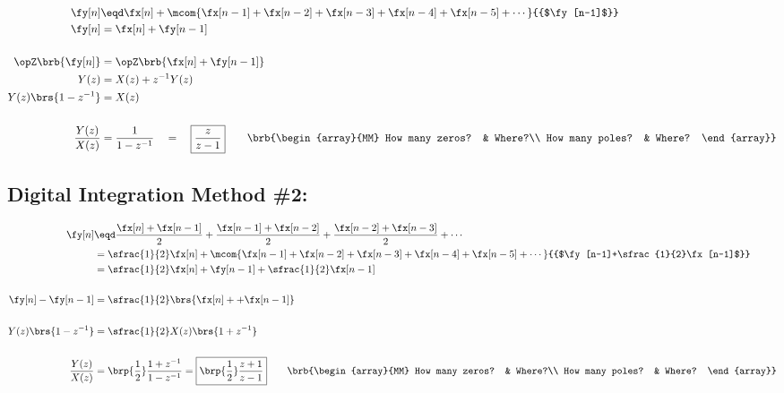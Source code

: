 {\begin{align*}
  \fy[n]
    &\eqd \fx[n] + \mcom{\fx[n-1] + \fx[n-2] + \fx[n-3] + \fx[n-4] + \fx[n-5] + \cdots}{{$\fy[n-1]$}}
  \\
  \fy[n] &=    \fx[n] + \fy[n-1]
  \\\\
  \opZ\brb{\fy[n]} &= \opZ\brb{\fx[n] + \fy[n-1]}
  \\
  Y(z) &= X(z) + z^{-1}Y(z)
  \\
  Y(z)\brs{1-z^{-1}} &= X(z)
  \\\\
  \frac{Y(z)}{X(z)} &= \frac{1}{1-z^{-1}} \quad=\quad \boxed{\frac{z}{z-1}}
  \qquad\brb{\begin{array}{MM}
    How many zeros? & Where?\\
    How many poles? & Where?
  \end{array}}
\end{align*}}


\subsection{Digital Integration Method \#2: }
 
{\begin{align*}
  \fy[n]
    &\eqd \frac{\fx[n]+\fx[n-1]}{2} + \frac{\fx[n-1]+\fx[n-2]}{2} + \frac{\fx[n-2]+\fx[n-3]}{2} + \cdots
  \\&=    \sfrac{1}{2}\fx[n] + \mcom{\fx[n-1] + \fx[n-2] + \fx[n-3] + \fx[n-4] + \fx[n-5] + \cdots}{{$\fy[n-1]+\sfrac{1}{2}\fx[n-1]$}}
  \\&=    \sfrac{1}{2}\fx[n] + \fy[n-1]+\sfrac{1}{2}\fx[n-1]
  \\\\
  \fy[n]-\fy[n-1]&=    \sfrac{1}{2}\brs{\fx[n] + +\fx[n-1]} 
  \\\\
  Y(z)\brs{1-z^{-1}} &= \sfrac{1}{2} X(z)\brs{1+z^{-1}}
  \\\\
  \frac{Y(z)}{X(z)} 
    &= \brp{\frac{1}{2}} \frac{1+z^{-1}}{1-z^{-1}}
     = \boxed{\brp{\frac{1}{2}} \frac{z+1}{z-1}} 
  \qquad\brb{\begin{array}{MM}
    How many zeros? & Where?\\
    How many poles? & Where?
  \end{array}}
\end{align*}}


